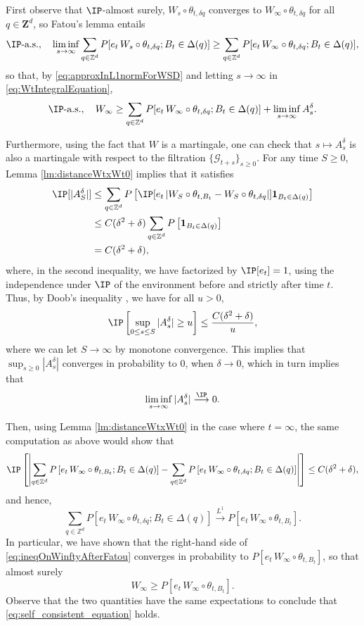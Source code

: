 First observe that $\IP$-almost surely, $W_s \circ \theta_{t,{\delta q}}$ converges  to $W_\infty \circ \theta_{t,{\delta q}}$ for all $q\in\mathbf{Z}^d$, so Fatou's lemma entails
\[\IP\text{-a.s.}, \quad \liminf_{s\to\infty} \sum_{q\in\mathbb{Z}^d} P [e_{t} \, W_s \circ \theta_{t,\delta q} ; B_t\in \Delta( q) ] \geq \sum_{q\in\mathbb{Z}^d} P [e_{t} \, W_\infty \circ \theta_{t,\delta q} ; B_t\in \Delta( q) ],\] so that, by \eqref{eq:approxInL1normForWSD} and letting $s\to\infty$ in \eqref{eq:WtIntegralEquation},
\begin{equation} \label{eq:ineqOnWinftyAfterFatou}
\IP\text{-a.s.}, \quad W_\infty \geq \sum_{q\in\mathbb{Z}^d} P [e_{t} \, W_\infty \circ \theta_{t,\delta q} ; B_t\in \Delta( q) ] + \liminf_{s\to\infty} A_s^\delta.
\end{equation}

Furthermore, using the fact that $W$ is a martingale, one can check that $s\mapsto A_s^\delta$ is also a martingale with respect to the filtration $\{\mathcal{G}_{t+s}\}_{s\geq 0}$.
For any time $S\geq 0$, Lemma \ref{lm:distanceWtxWt0} implies that it satisfies
\begin{align*}
\IP[|A_S^\delta|] & \leq \sum_{q\in\mathbb{Z}^d} P \left[\IP[e_{t}\,|W_S \circ \theta_{t,B_t}- W_S \circ \theta_{t,\delta q}|] \mathbf{1}_{B_t\in \Delta( q)} \right]\\
&\leq C(\delta^2 + \delta) \sum_{q\in\mathbb{Z}^d} P\left[ \mathbf{1}_{B_t\in \Delta( q)}\right]\\ &= C(\delta^2 + \delta),
\end{align*}
where, in the second inequality, we have factorized by $\IP[e_{t}] = 1$, using the independence under $\IP$ of the environment before and strictly after time $t$. Thus, by Doob's inequality \cite[Th. 3.8 (i), Ch.~1]{KS91}, we have for all $u>0$,
\[\IP\left[\sup_{0\leq s\leq S} |A_s^\delta| \geq u \right] \leq \frac{C(\delta^2 + \delta)}{u},\]
where we can let $S\to\infty$ by monotone convergence. This implies that $\sup_{s\geq 0} |A_s^\delta|$ converges in probability to $0$, when $\delta \to 0$, which in turn implies that
\[\liminf_{s\to\infty} |A_s^\delta| \overset{\IP}{\longrightarrow} 0.\]

Then, using Lemma \ref{lm:distanceWtxWt0} in the case where $t=\infty$, the same computation as above would show that
\[\IP\left[ \left| \sum_{q\in\mathbb{Z}^d}P \left[e_{t} \, W_\infty \circ \theta_{t,B_t} ; B_t\in \Delta( q)\right]- \sum_{q\in\mathbb{Z}^d} P \left[e_t \, W_\infty \circ \theta_{t,\delta q} ; B_t\in \Delta( q)\right] \right| \right] \leq C(\delta^2 + \delta),\]
and hence,
\[\sum_{q\in\mathbb{Z}^d} P \left[e_t \, W_\infty \circ \theta_{t,\delta q} ; B_t\in \Delta( q)\right]   \overset{L^1}{\longrightarrow} P [e_{t} \, W_\infty \circ \theta_{t,B_t}].\]
In particular, we have shown that the right-hand side of \eqref{eq:ineqOnWinftyAfterFatou} converges in probability to $P [e_{t} \, W_\infty \circ \theta_{t,B_t}]$, so that almost surely
\[ W_\infty \geq  P [e_{t} \, W_\infty \circ \theta_{t,B_t}].\]
Observe that the two quantities have the same expectations to conclude that \eqref{eq:self_consistent_equation} holds.


